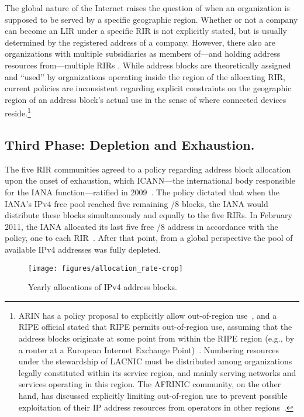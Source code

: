 \documentclass[letter]{sigcomm-alternate}
\begin{document}
The global nature of the Internet raises the question of when an organization
is supposed to be served by a specific geographic region. Whether or not a
company can become an LIR under a specific RIR is not explicitly stated, but is
usually determined by the registered address of a company. However, there
also are organizations with multiple subsidiaries as members of---and holding
address resources from---multiple RIRs \cite{icann_legacy_meeting}. While 
address blocks are theoretically assigned and ``used'' by
organizations operating inside the region of the allocating RIR, current
policies are inconsistent regarding explicit constraints on the geographic 
region of an address block's actual use in the sense of where connected devices 
reside.\footnote{ARIN has a policy proposal to explicitly allow out-of-region
  use~\cite{arin_outofregion}, and a RIPE official stated that RIPE
  permits out-of-region use, assuming that the address blocks
  originate at some point from within the RIPE region (e.g., by a router
  at a European Internet Exchange
  Point)~\cite{ripe_outofregion}.   Numbering resources under the
  stewardship of LACNIC must be distributed among organizations legally
  constituted within its service region, and mainly serving networks and
  services operating in this region.  The AFRINIC community, on the
  other hand, has discussed explicitly limiting out-of-region use to
  prevent possible exploitation of their IP address resources from
  operators in other regions~\cite{afrinic_outofregion}.  }

\subsection{Third Phase: Depletion and Exhaustion.}

The five RIR communities agreed to a policy regarding address block allocation
upon the onset of exhaustion, which ICANN---the international body responsible
for the IANA function---ratified in 2009~\cite{icann_lastslash8}.
The policy dictated that when the IANA's IPv4 free pool 
reached five remaining /8 blocks, the IANA would distribute these blocks 
simultaneously and equally to the five RIRs.  In February 2011, the IANA allocated 
its last five free /8 address in accordance with the policy, one to each 
RIR~\cite{nro_depletion}. After that point, from a global perspective the pool 
of available IPv4 addresses was fully depleted.

\begin{figure}
  \texttt{[image: figures/allocation\_rate-crop]}
  \caption{Yearly allocations of IPv4 address blocks.}
  \vspace{-1em}
  \label{fig:history_allocations}
\end{figure} 
\end{document}
